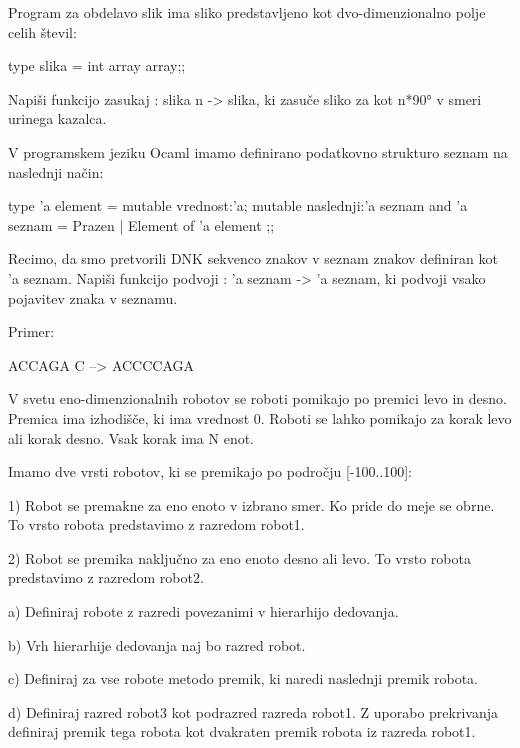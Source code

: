 \begin{ex}
  Program za obdelavo slik ima sliko predstavljeno kot
  dvo-dimenzionalno polje celih \v stevil:

  type slika = int array array;;

  Napi\v si funkcijo zasukaj : slika n -> slika, ki zasu\v ce sliko za
  kot n*90° v smeri urinega kazalca.


\end{ex} 
\begin{ex}
  V programskem jeziku Ocaml imamo definirano podatkovno strukturo
  seznam na naslednji na\v cin:

  type 'a element = { 
     mutable vrednost:'a; 
     mutable naslednji:'a seznam 
  }
  and 'a seznam = Prazen | Element of 'a element ;;

  Recimo, da smo pretvorili DNK sekvenco znakov v seznam znakov
  definiran kot 'a seznam. Napi\v si funkcijo podvoji : 'a seznam ->
  'a seznam, ki podvoji vsako pojavitev znaka v seznamu.

  Primer:

  ACCAGA C --> ACCCCAGA


\end{ex} 
\begin{ex}
  V svetu eno-dimenzionalnih robotov se roboti pomikajo po premici
  levo in desno. Premica ima izhodi\v s\v ce, ki ima vrednost
  0. Roboti se lahko pomikajo za korak levo ali korak desno. Vsak
  korak ima N enot.

  Imamo dve vrsti robotov, ki se premikajo po podro\v cju [-100..100]:

  1) Robot se premakne za eno enoto v izbrano smer. Ko pride do meje
  se obrne. To vrsto robota predstavimo z razredom robot1.  

  2) Robot se premika naklju\v cno za eno enoto desno ali levo. To
  vrsto robota predstavimo z razredom robot2.

  a) Definiraj robote z razredi povezanimi v hierarhijo dedovanja.

  b) Vrh hierarhije dedovanja naj bo razred robot.

  c) Definiraj za vse robote metodo premik, ki naredi naslednji premik
  robota.

  d) Definiraj razred robot3 kot podrazred razreda robot1. Z uporabo
  prekrivanja definiraj premik tega robota kot dvakraten premik robota
  iz razreda robot1.




\end{ex} 
